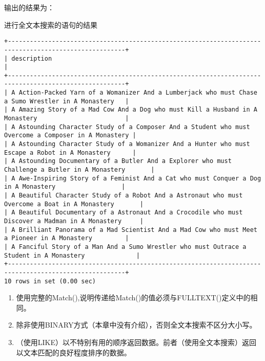 \documentclass[UTF8]{article}
\begin{document}
输出的结果为：

\begin{listing}[H]
	\caption{进行全文本搜索的语句的结果}
	\label{code:fulltextselectclauseresult}
\begin{verbatim}
+------------------------------------------------------------------------------------------------------+
| description                                                                                          |
+------------------------------------------------------------------------------------------------------+
| A Action-Packed Yarn of a Womanizer And a Lumberjack who must Chase a Sumo Wrestler in A Monastery   |
| A Amazing Story of a Mad Cow And a Dog who must Kill a Husband in A Monastery                        |
| A Astounding Character Study of a Composer And a Student who must Overcome a Composer in A Monastery |
| A Astounding Character Study of a Womanizer And a Hunter who must Escape a Robot in A Monastery      |
| A Astounding Documentary of a Butler And a Explorer who must Challenge a Butler in A Monastery       |
| A Awe-Inspiring Story of a Feminist And a Cat who must Conquer a Dog in A Monastery                  |
| A Beautiful Character Study of a Robot And a Astronaut who must Overcome a Boat in A Monastery       |
| A Beautiful Documentary of a Astronaut And a Crocodile who must Discover a Madman in A Monastery     |
| A Brilliant Panorama of a Mad Scientist And a Mad Cow who must Meet a Pioneer in A Monastery         |
| A Fanciful Story of a Man And a Sumo Wrestler who must Outrace a Student in A Monastery              |
+------------------------------------------------------------------------------------------------------+
10 rows in set (0.00 sec)
\end{verbatim}
\end{listing}

\begin{orangebox}[frametitle={Tips 18.2.1 MATCH注意事项}]
        \begin{enumerate}
                \item 使用完整的Match(),说明传递给Match()的值必须与FULLTEXT()定义中的相同。
                \item 除非使用BINARY方式（本章中没有介绍），否则全文本搜索不区分大小写。
                \item （使用LIKE）以不特别有用的顺序返回数据。前者（使用全文本搜索）返回以文本匹配的良好程度排序的数据。
        \end{enumerate}
\end{orangebox}  
\end{document}
